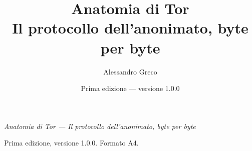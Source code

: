 \documentclass[11pt,openright,twoside]{book}
\title{Anatomia di Tor\\[0.5em]\large Il protocollo dell'anonimato, byte per byte}
\author{Alessandro Greco}
\date{Prima edizione --- versione 1.0.0}
\begin{document}
\frontmatter
\maketitle
\thispagestyle{empty}
\null\vfill
{\footnotesize
\noindent \textit{Anatomia di Tor --- Il protocollo dell'anonimato, byte per byte}\par
\medskip
\DirittiLicenza
\medskip
\DirittiMarchi
\bigskip
\noindent Prima edizione, versione 1.0.0. Formato A4.\par
}
\clearpage
\tableofcontents



\mainmatter


\backmatter
\printbibliography[heading=bibintoc,title={Bibliografia}]
\printindex
\end{document}

